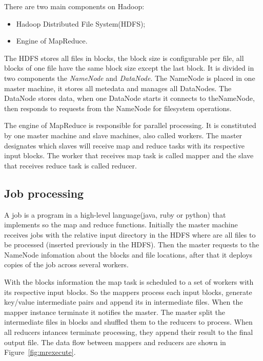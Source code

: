 There are two main components on Hadoop:
\begin{itemize}
	\item Hadoop Distributed File System(HDFS);
	\item Engine of MapReduce.
\end{itemize}

The HDFS stores all files in blocks, the block size is configurable per file, all
blocks of one file have the same block size except the last block. It is divided
in two components the \textit{NameNode} and \textit{DataNode}. The NameNode is placed
in one master machine, it stores all metedata and manages all DataNodes. The DataNode
stores data, when one DataNode starts it connects to theNameNode, then responds
to requests from the NameNode for filesystem operations.

The engine of MapReduce is responsible for parallel processing. It is constituted
by one master machine and slave machines, also called workers. The master
designates which slaves will receive map and reduce tasks with its respective input
blocks. The worker that receives map task is called mapper and the slave that receives
reduce task is called reducer.

\subsection{Job processing}

A job is a program in a high-level language(java, ruby or python) that implements
so the map and reduce functions. Initially the master machine receives jobs with
the relative input directory in the HDFS where are all files to be processed (inserted
previously in the HDFS). Then the master requests to the NameNode infomation
about the blocks and file locations, after that it deploys copies of the job across
several workers.

With the blocks information the map task is scheduled to a set of workers
with its respective input blocks. So the mappers process each input blocks, 
generate key/value intermediate pairs and append its in intermediate files. When
the mapper instance terminate it notifies the master. The master split the intermediate
files in blocks and shuffled them to the reducers to process. When all reducers
intances terminate processing, they append their result to the final output file.
The data flow between mappers and reducers are shown in Figure~\ref{fig:mrexecute}.

